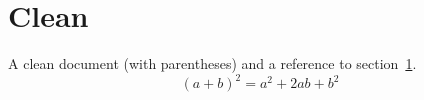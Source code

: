 \documentclass{article}
\begin{document}
\section{Clean}\label{sec:clean}
A clean document (with parentheses) and a reference to section~\ref{sec:clean}.
\[ (a+b)^2 = a^2 + 2ab + b^2 \]
\end{document}
